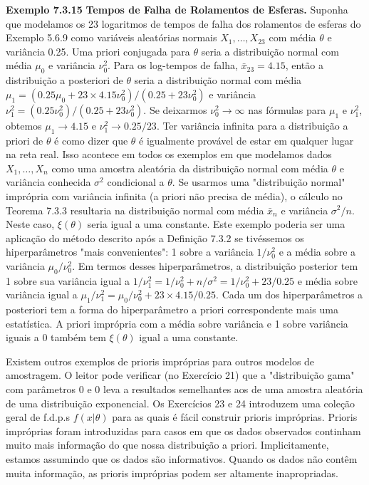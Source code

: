 \vspace{1cm}
\noindent\textbf{Exemplo 7.3.15} \quad \textbf{Tempos de Falha de Rolamentos de Esferas.} Suponha que modelamos os 23 logaritmos de tempos de falha dos rolamentos de esferas do Exemplo 5.6.9 como variáveis aleatórias normais $X_1, \dots, X_{23}$ com média $\theta$ e variância 0.25. Uma priori conjugada para $\theta$ seria a distribuição normal com média $\mu_0$ e variância $\nu_0^2$. Para os log-tempos de falha, $\bar{x}_{23}=4.15$, então a distribuição a posteriori de $\theta$ seria a distribuição normal com média $\mu_1 = (0.25\mu_0+23 \times 4.15\nu_0^2)/(0.25+23\nu_0^2)$ e variância $\nu_1^2 = (0.25\nu_0^2)/(0.25+23\nu_0^2)$. Se deixarmos $\nu_0^2 \to \infty$ nas fórmulas para $\mu_1$ e $\nu_1^2$, obtemos $\mu_1 \to 4.15$ e $\nu_1^2 \to 0.25/23$. Ter variância infinita para a distribuição a priori de $\theta$ é como dizer que $\theta$ é igualmente provável de estar em qualquer lugar na reta real. Isso acontece em todos os exemplos em que modelamos dados $X_1, \dots, X_n$ como uma amostra aleatória da distribuição normal com média $\theta$ e variância conhecida $\sigma^2$ condicional a $\theta$. Se usarmos uma "distribuição normal" imprópria com variância infinita (a priori não precisa de média), o cálculo no Teorema 7.3.3 resultaria na distribuição normal com média $\bar{x}_n$ e variância $\sigma^2/n$. Neste caso, $\xi(\theta)$ seria igual a uma constante.
Este exemplo poderia ser uma aplicação do método descrito após a Definição 7.3.2 se tivéssemos os hiperparâmetros "mais convenientes": 1 sobre a variância $1/\nu_0^2$ e a média sobre a variância $\mu_0/\nu_0^2$. Em termos desses hiperparâmetros, a distribuição posterior tem 1 sobre sua variância igual a $1/\nu_1^2=1/\nu_0^2+n/\sigma^2=1/\nu_0^2+23/0.25$ e média sobre variância igual a $\mu_1/\nu_1^2 = \mu_0/\nu_0^2+23 \times 4.15/0.25$. Cada um dos hiperparâmetros a posteriori tem a forma do hiperparâmetro a priori correspondente mais uma estatística. A priori imprópria com a média sobre variância e 1 sobre variância iguais a 0 também tem $\xi(\theta)$ igual a uma constante.

\vspace{1cm}
Existem outros exemplos de prioris impróprias para outros modelos de amostragem. O leitor pode verificar (no Exercício 21) que a "distribuição gama" com parâmetros 0 e 0 leva a resultados semelhantes aos de uma amostra aleatória de uma distribuição exponencial. Os Exercícios 23 e 24 introduzem uma coleção geral de f.d.p.s $f(x|\theta)$ para as quais é fácil construir prioris impróprias.
Prioris impróprias foram introduzidas para casos em que os dados observados continham muito mais informação do que nossa distribuição a priori. Implicitamente, estamos assumindo que os dados são informativos. Quando os dados não contêm muita informação, as prioris impróprias podem ser altamente inapropriadas.

